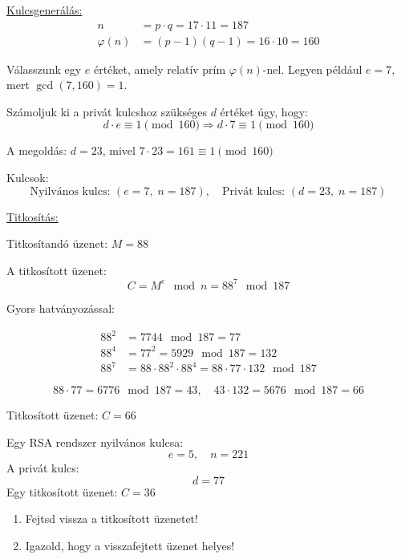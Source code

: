 \begin{solution}
    \underline{Kulcsgenerálás:}
    \begin{align*}
        n &= p \cdot q = 17 \cdot 11 = 187 \\
        \varphi(n) &= (p - 1)(q - 1) = 16 \cdot 10 = 160
    \end{align*}

    Válasszunk egy \( e \) értéket, amely relatív prím \( \varphi(n) \)-nel.  
    Legyen például \( e = 7 \), mert \( \gcd(7, 160) = 1 \).

    Számoljuk ki a privát kulcshoz szükséges \( d \) értéket úgy, hogy:
    \[
    d \cdot e \equiv 1 \pmod{160}
    \Rightarrow d \cdot 7 \equiv 1 \pmod{160}
    \]

    A megoldás: \( d = 23 \), mivel \( 7 \cdot 23 = 161 \equiv 1 \pmod{160} \)

    Kulcsok:
    \[
    \text{Nyilvános kulcs: } (e = 7,\; n = 187), \quad
    \text{Privát kulcs: } (d = 23,\; n = 187)
    \]

    \underline{Titkosítás:}

    Titkosítandó üzenet: \( M = 88 \)

    A titkosított üzenet:
    \[
    C = M^e \mod n = 88^7 \mod 187
    \]

    Gyors hatványozással:

    \begin{align*}
        88^2 &= 7744 \mod 187 = 77 \\
        88^4 &= 77^2 = 5929 \mod 187 = 132 \\
        88^7 &= 88 \cdot 88^2 \cdot 88^4 = 88 \cdot 77 \cdot 132 \mod 187
    \end{align*}

    \[
    88 \cdot 77 = 6776 \mod 187 = 43, \quad
    43 \cdot 132 = 5676 \mod 187 = \boxed{66}
    \]

    Titkosított üzenet: \( C = 66 \)
\end{solution}

\begin{extraproblem}
    Egy RSA rendszer nyilvános kulcsa:
\[
e = 5, \quad n = 221
\]
A privát kulcs:
\[
d = 77
\]
Egy titkosított üzenet: \( C = 36 \)
\begin{enumerate}
    \item Fejtsd vissza a titkosított üzenetet!
    \item Igazold, hogy a visszafejtett üzenet helyes!
\end{enumerate}
\end{extraproblem}

